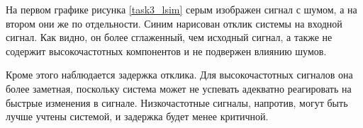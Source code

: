 \documentclass[a4paper,oneside,14pt]{extreport}
\begin{document}
На первом графике рисунка \ref{task3_lsim} серым изображен сигнал с шумом, а на втором они же по отдельности. Синим нарисован отклик системы на входной сигнал. Как видно, он более сглаженный, чем исходный сигнал, а также не содержит высокочастотных компонентов и не подвержен влиянию шумов.

Кроме этого наблюдается задержка отклика. Для  высокочастотных сигналов она более заметная, поскольку система может не успевать адекватно реагировать на быстрые изменения в сигнале. Низкочастотные сигналы, напротив, могут быть лучше учтены системой, и задержка будет менее критичной.
\end{document}
